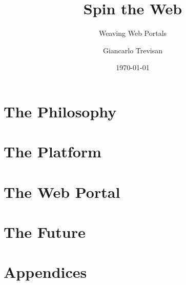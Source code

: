 \documentclass[11pt,openright,twoside,a4paper]{book}
\title{Spin the Web}
\subtitle{Weaving Web Portals}
\author{Giancarlo Trevisan}
\date{\today}
\begin{document}
\frontmatter






\tableofcontents

\mainmatter

\part{The Philosophy}






\part{The Platform}









\part{The Web Portal}




\part{The Future}



\appendix
\part*{Appendices}


\backmatter
\nocite{*}


\printglossary
\printindex
\end{document}
